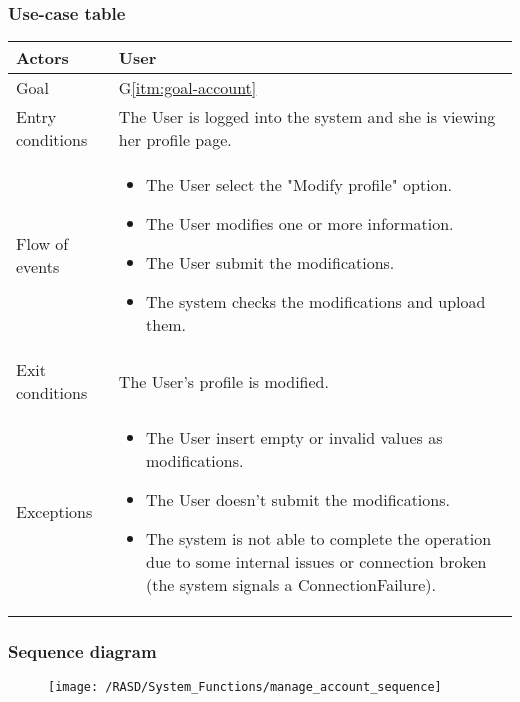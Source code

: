 \subsubsection{Use-case table}
\begin{center}
  \begin{tabular}{ l | p{10cm} }
    \hline
    Actors & User\\ \hline
    Goal & G\ref{itm:goal-account}\\ \hline
    Entry conditions & The User is logged into the system and she is viewing her profile page.   
    \\ \hline
    Flow of events &
      \begin{itemize}
        \item The User select the "Modify profile" option.
        \item The User modifies one or more information.
        \item The User submit the modifications.
        \item The system checks the modifications and upload them.
      \end{itemize} 
      \\ \hline
    Exit conditions & The User's profile is modified. \\ \hline
  Exceptions & 
\begin{itemize}
\item The User insert empty or invalid values as modifications.
\item The User doesn't submit the modifications.
\item The system is not able to complete the operation due to some internal issues or connection broken (the system signals a ConnectionFailure).%
\end{itemize} \\ \hline
  \end{tabular}
\end{center}


\subsubsection{Sequence diagram}
\begin{figure}[!ht]
  \centering
  \vspace{0.1cm}
  \texttt{[image: /RASD/System\_Functions/manage\_account\_sequence]}\\
  \vspace{0.1cm}
  \label{fig:manage_account_sequence} 
\end{figure}

